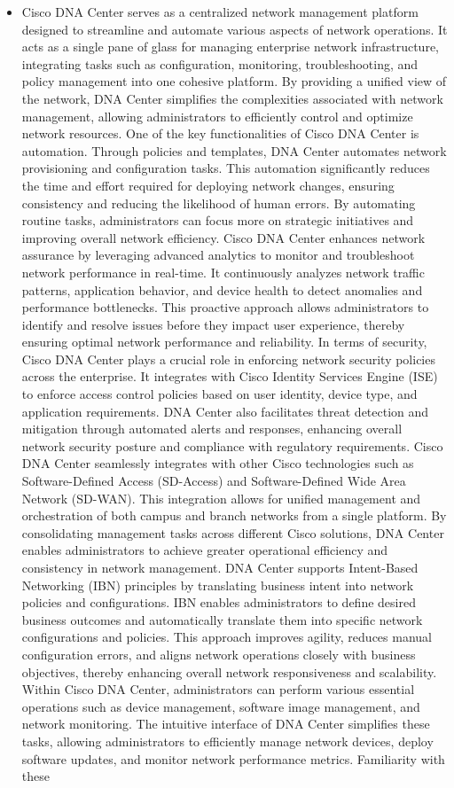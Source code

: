 \documentclass{article}
\begin{document}
\begin{itemize}
 	\item[] Cisco DNA Center serves as a centralized network management platform designed to streamline and automate various aspects of network operations. It acts as a single pane of glass for managing enterprise network infrastructure, integrating tasks such as configuration, monitoring, troubleshooting, and policy management into one cohesive platform. By providing a unified view of the network, DNA Center simplifies the complexities associated with network management, allowing administrators to efficiently control and optimize network resources. One of the key functionalities of Cisco DNA Center is automation. Through policies and templates, DNA Center automates network provisioning and configuration tasks. This automation significantly reduces the time and effort required for deploying network changes, ensuring consistency and reducing the likelihood of human errors. By automating routine tasks, administrators can focus more on strategic initiatives and improving overall network efficiency. Cisco DNA Center enhances network assurance by leveraging advanced analytics to monitor and troubleshoot network performance in real-time. It continuously analyzes network traffic patterns, application behavior, and device health to detect anomalies and performance bottlenecks. This proactive approach allows administrators to identify and resolve issues before they impact user experience, thereby ensuring optimal network performance and reliability. In terms of security, Cisco DNA Center plays a crucial role in enforcing network security policies across the enterprise. It integrates with Cisco Identity Services Engine (ISE) to enforce access control policies based on user identity, device type, and application requirements. DNA Center also facilitates threat detection and mitigation through automated alerts and responses, enhancing overall network security posture and compliance with regulatory requirements. Cisco DNA Center seamlessly integrates with other Cisco technologies such as Software-Defined Access (SD-Access) and Software-Defined Wide Area Network (SD-WAN). This integration allows for unified management and orchestration of both campus and branch networks from a single platform. By consolidating management tasks across different Cisco solutions, DNA Center enables administrators to achieve greater operational efficiency and consistency in network management. DNA Center supports Intent-Based Networking (IBN) principles by translating business intent into network policies and configurations. IBN enables administrators to define desired business outcomes and automatically translate them into specific network configurations and policies. This approach improves agility, reduces manual configuration errors, and aligns network operations closely with business objectives, thereby enhancing overall network responsiveness and scalability. Within Cisco DNA Center, administrators can perform various essential operations such as device management, software image management, and network monitoring. The intuitive interface of DNA Center simplifies these tasks, allowing administrators to efficiently manage network devices, deploy software updates, and monitor network performance metrics. Familiarity with these 
\end{itemize}
\end{document}
